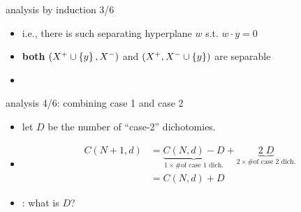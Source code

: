\documentclass[aspectratio=169, 11pt, handout]{beamer}
\begin{document}
\begin{frame}{analysis by induction 3/6}
  
  \begin{itemize}
  \item i.e., there is such separating hyperplane $w$ s.t. $w\cdot y = 0$\pause
  \item  \textbf{both} $\left(X^{+} \cup \left\{y\right\}, X^{-}\right)$ and $\left(X^{+}, X^{-}  \cup \left\{y\right\}\right)$ are separable
  \item {}
  \end{itemize}

  \centering
\end{frame}

\begin{frame}{analysis 4/6: combining case 1 and case 2}
  \begin{itemize}
  \item let $D$ be the number of ``case-2'' dichotomies. \pause
  \item[] {
      \begin{align*}
        C(N+1, d) &= \underbrace{C(N, d) - D}_{1\times\text{\# of case 1 dich.}} + \underbrace{2\;D}_{2\times \text{\# of case 2 dich.}}\\
                  &= C(N, d) + D
      \end{align*}
      
    }\pause
    \item {}: what is $D$?
  \end{itemize}
  


\end{frame}
\end{document}
